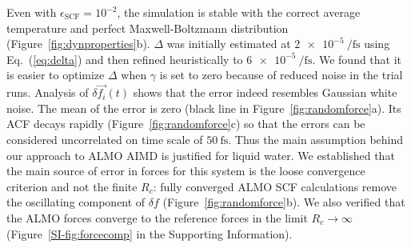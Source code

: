 \documentclass[aip,jcp,reprint,amsmath,amssymb]{revtex4-1}
\begin{document}
Even with $\epsilon_{\text{SCF}} = 10^{-2}$, the simulation is stable with the correct average temperature and perfect Maxwell-Boltzmann distribution (Figure~\ref{fig:dynproperties}b). $\Delta$ was initially estimated at $\SI{2e-5}{\per\fs}$ using Eq.~(\ref{eq:delta}) and then refined heuristically to $\SI{6e-5}{\per\fs}$. 
We found that it is easier to optimize $\Delta$ when $\gamma$ is set to zero because of reduced noise in the trial runs. 
%
Analysis of $\delta \vec{f_{i}}(t)$ shows that the error indeed resembles Gaussian white noise. The mean of the error is zero (black line in Figure~\ref{fig:randomforce}a). Its ACF decays rapidly (Figure~\ref{fig:randomforce}c) so that the errors can be considered uncorrelated on time scale of $\SI{50}{\fs}$. Thus the main assumption behind our approach to ALMO AIMD is justified for liquid water. We established that the main source of error in forces for this system is the loose convergence criterion and not the finite $R_c$: fully converged ALMO SCF calculations remove the oscillating component of $\delta f$ (Figure~\ref{fig:randomforce}b). We also verified that the ALMO forces converge to the reference forces in the limit $R_{c} \rightarrow \infty$ 
(Figure~\ref{SI-fig:forcecomp} in the Supporting Information).


\end{document}
